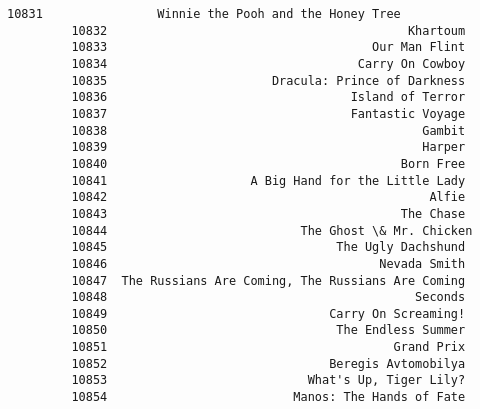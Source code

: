 \documentclass[11pt]{article}
\begin{document}
\begin{Verbatim}[commandchars=\\\{\}]
         10831                Winnie the Pooh and the Honey Tree   
         10832                                          Khartoum   
         10833                                     Our Man Flint   
         10834                                   Carry On Cowboy   
         10835                       Dracula: Prince of Darkness   
         10836                                  Island of Terror   
         10837                                  Fantastic Voyage   
         10838                                            Gambit   
         10839                                            Harper   
         10840                                         Born Free   
         10841                    A Big Hand for the Little Lady   
         10842                                             Alfie   
         10843                                         The Chase   
         10844                           The Ghost \& Mr. Chicken   
         10845                                The Ugly Dachshund   
         10846                                      Nevada Smith   
         10847  The Russians Are Coming, The Russians Are Coming   
         10848                                           Seconds   
         10849                               Carry On Screaming!   
         10850                                The Endless Summer   
         10851                                        Grand Prix   
         10852                               Beregis Avtomobilya   
         10853                            What's Up, Tiger Lily?   
         10854                          Manos: The Hands of Fate   
         

\end{Verbatim}
\end{document}
